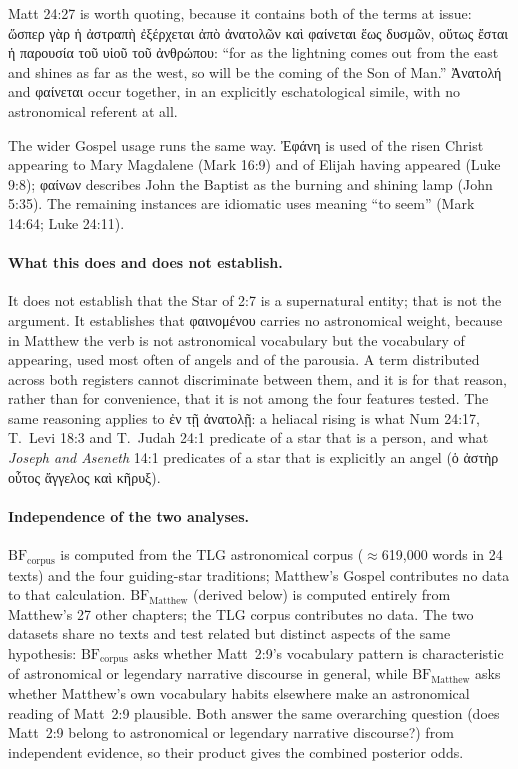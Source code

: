 \documentclass[11pt,a4paper]{article}
\newcommand{\grk}[1]{{\fontencoding{LGR}\selectfont #1}}
\newcommand{\grk}[1]{{\greekfont #1}}
\begin{document}
Matt 24:27 is worth quoting, because it contains both of the terms at issue:
\grk{ὥσπερ γὰρ ἡ ἀστραπὴ ἐξέρχεται ἀπὸ ἀνατολῶν καὶ φαίνεται ἕως δυσμῶν, οὕτως
ἔσται ἡ παρουσία τοῦ υἱοῦ τοῦ ἀνθρώπου}: ``for as the lightning comes out from
the east and shines as far as the west, so will be the coming of the Son of
Man.'' \grk{Ἀνατολή} and \grk{φαίνεται} occur together, in an explicitly
eschatological simile, with no astronomical referent at all.

The wider Gospel usage runs the same way. \grk{Ἐφάνη} is used of the risen
Christ appearing to Mary Magdalene (Mark 16:9) and of Elijah having appeared
(Luke 9:8); \grk{φαίνων} describes John the Baptist as the burning and shining
lamp (John 5:35). The remaining instances are idiomatic uses meaning ``to seem''
(Mark 14:64; Luke 24:11).

\paragraph{What this does and does not establish.}
It does not establish that the Star of 2:7 is a supernatural entity; that is not
the argument. It establishes that \grk{φαινομένου} carries no astronomical
weight, because in Matthew the verb is not astronomical vocabulary but the
vocabulary of appearing, used most often of angels and of the parousia. A term
distributed across both registers cannot discriminate between them, and it is
for that reason, rather than for convenience, that it is not among the four
features tested. The same reasoning applies to \grk{ἐν τῇ ἀνατολῇ}: a heliacal
rising is what Num 24:17, T.~Levi 18:3 and T.~Judah 24:1 predicate of a star
that is a person, and what \textit{Joseph and Aseneth} 14:1 predicates of a star
that is explicitly an angel (\grk{ὁ ἀστὴρ οὗτος ἄγγελος καὶ κῆρυξ}).

\paragraph{Independence of the two analyses.}

$\mathrm{BF}_\text{corpus}$ is computed from the TLG astronomical corpus ($\approx$619{,}000 words
in 24 texts) and the four guiding-star traditions; Matthew's Gospel contributes no
data to that calculation. $\mathrm{BF}_\text{Matthew}$ (derived below) is computed
entirely from Matthew's 27 other chapters; the TLG corpus contributes no data.
The two datasets share no texts and test related but distinct aspects of the same
hypothesis: $\mathrm{BF}_\text{corpus}$ asks whether Matt~2:9's vocabulary pattern
is characteristic of astronomical or legendary narrative discourse in general,
while $\mathrm{BF}_\text{Matthew}$ asks whether Matthew's own vocabulary habits
elsewhere make an astronomical reading of Matt~2:9 plausible. Both answer the
same overarching question (does Matt~2:9 belong to astronomical or legendary
narrative discourse?) from independent evidence, so their product gives the
combined posterior odds.
\end{document}
